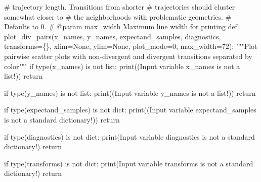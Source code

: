 \documentclass[
  letterpaper,
  DIV=11,
  numbers=noendperiod]{scrartcl}
\newenvironment{Shaded}{\begin{snugshade}}{\end{snugshade}}
\newcommand{\BuiltInTok}[1]{\textcolor[rgb]{0.00,0.23,0.31}{#1}}
\newcommand{\CommentTok}[1]{\textcolor[rgb]{0.37,0.37,0.37}{#1}}
\newcommand{\ControlFlowTok}[1]{\textcolor[rgb]{0.00,0.23,0.31}{#1}}
\newcommand{\DecValTok}[1]{\textcolor[rgb]{0.68,0.00,0.00}{#1}}
\newcommand{\KeywordTok}[1]{\textcolor[rgb]{0.00,0.23,0.31}{#1}}
\newcommand{\NormalTok}[1]{\textcolor[rgb]{0.00,0.23,0.31}{#1}}
\newcommand{\OperatorTok}[1]{\textcolor[rgb]{0.37,0.37,0.37}{#1}}
\newcommand{\StringTok}[1]{\textcolor[rgb]{0.13,0.47,0.30}{#1}}
\newcommand{\VariableTok}[1]{\textcolor[rgb]{0.07,0.07,0.07}{#1}}
\begin{document}
\begin{Shaded}
\begin{Highlighting}[]
\CommentTok{\#                        trajectory length.  Transitions from shorter}
\CommentTok{\#                        trajectories should cluster somewhat closer to }
\CommentTok{\#                        the neighborhoods with problematic geometries.}
\CommentTok{\#                   Defaults to 0.}
\CommentTok{\# @param max\_width Maximum line width for printing}
\KeywordTok{def}\NormalTok{ plot\_div\_pairs(x\_names, y\_names, expectand\_samples, }
\NormalTok{                   diagnostics, transforms}\OperatorTok{=}\NormalTok{\{\},}
\NormalTok{                   xlim}\OperatorTok{=}\VariableTok{None}\NormalTok{, ylim}\OperatorTok{=}\VariableTok{None}\NormalTok{, }
\NormalTok{                   plot\_mode}\OperatorTok{=}\DecValTok{0}\NormalTok{, max\_width}\OperatorTok{=}\DecValTok{72}\NormalTok{):}
  \CommentTok{"""Plot pairwise scatter plots with non{-}divergent and divergent }
\CommentTok{     transitions separated by color"""}
  \ControlFlowTok{if} \BuiltInTok{type}\NormalTok{(x\_names) }\KeywordTok{is} \KeywordTok{not} \BuiltInTok{list}\NormalTok{:}
    \BuiltInTok{print}\NormalTok{((}\StringTok{\textquotesingle{}Input variable \textasciigrave{}x\_names\textasciigrave{} is not a list!\textquotesingle{}}\NormalTok{))}
    \ControlFlowTok{return}
  
  \ControlFlowTok{if} \BuiltInTok{type}\NormalTok{(y\_names) }\KeywordTok{is} \KeywordTok{not} \BuiltInTok{list}\NormalTok{:}
    \BuiltInTok{print}\NormalTok{((}\StringTok{\textquotesingle{}Input variable \textasciigrave{}y\_names\textasciigrave{} is not a list!\textquotesingle{}}\NormalTok{))}
    \ControlFlowTok{return}
    
  \ControlFlowTok{if} \BuiltInTok{type}\NormalTok{(expectand\_samples) }\KeywordTok{is} \KeywordTok{not} \BuiltInTok{dict}\NormalTok{:}
    \BuiltInTok{print}\NormalTok{((}\StringTok{\textquotesingle{}Input variable \textasciigrave{}expectand\_samples\textasciigrave{} \textquotesingle{}}
           \StringTok{\textquotesingle{}is not a standard dictionary!\textquotesingle{}}\NormalTok{))}
    \ControlFlowTok{return}
  
  \ControlFlowTok{if} \BuiltInTok{type}\NormalTok{(diagnostics) }\KeywordTok{is} \KeywordTok{not} \BuiltInTok{dict}\NormalTok{:}
    \BuiltInTok{print}\NormalTok{(}\StringTok{\textquotesingle{}Input variable \textasciigrave{}diagnostics\textasciigrave{} is not a standard dictionary!\textquotesingle{}}\NormalTok{)}
    \ControlFlowTok{return}
  
  \ControlFlowTok{if} \BuiltInTok{type}\NormalTok{(transforms) }\KeywordTok{is} \KeywordTok{not} \BuiltInTok{dict}\NormalTok{:}
    \BuiltInTok{print}\NormalTok{(}\StringTok{\textquotesingle{}Input variable \textasciigrave{}transforms\textasciigrave{} is not a standard dictionary!\textquotesingle{}}\NormalTok{)}
    \ControlFlowTok{return}
  

\end{Highlighting}
\end{Shaded}
\end{document}
